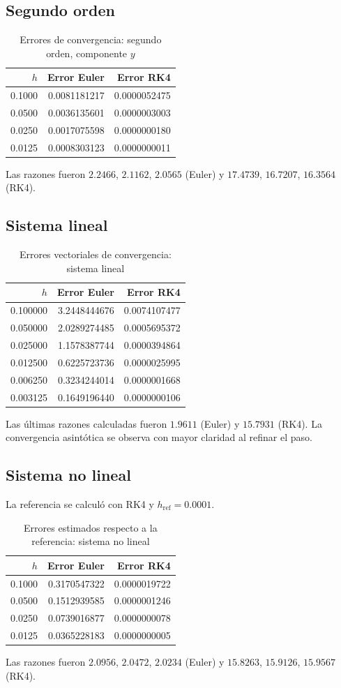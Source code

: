 \documentclass[12pt,letterpaper]{article}
\begin{document}
\subsection{Segundo orden}
\begin{table}[H]\centering\caption{Errores de convergencia: segundo orden, componente $y$}\small\begin{tabular}{rrr}\toprule $h$ & Error Euler & Error RK4\\\midrule
0.1000&0.0081181217&0.0000052475\\
0.0500&0.0036135601&0.0000003003\\
0.0250&0.0017075598&0.0000000180\\
0.0125&0.0008303123&0.0000000011\\\bottomrule\end{tabular}\end{table}
Las razones fueron $2.2466$, $2.1162$, $2.0565$ (Euler) y $17.4739$, $16.7207$, $16.3564$ (RK4).
\subsection{Sistema lineal}
\begin{table}[H]\centering\caption{Errores vectoriales de convergencia: sistema lineal}\small\begin{tabular}{rrr}\toprule $h$ & Error Euler & Error RK4\\\midrule
0.100000&3.2448444676&0.0074107477\\
0.050000&2.0289274485&0.0005695372\\
0.025000&1.1578387744&0.0000394864\\
0.012500&0.6225723736&0.0000025995\\
0.006250&0.3234244014&0.0000001668\\
0.003125&0.1649196440&0.0000000106\\\bottomrule\end{tabular}\end{table}
Las últimas razones calculadas fueron $1.9611$ (Euler) y $15.7931$ (RK4). La convergencia asintótica se observa con mayor claridad al refinar el paso.
\subsection{Sistema no lineal}
La referencia se calculó con RK4 y $h_{\mathrm{ref}}=0.0001$.
\begin{table}[H]\centering\caption{Errores estimados respecto a la referencia: sistema no lineal}\small\begin{tabular}{rrr}\toprule $h$ & Error Euler & Error RK4\\\midrule
0.1000&0.3170547322&0.0000019722\\
0.0500&0.1512939585&0.0000001246\\
0.0250&0.0739016877&0.0000000078\\
0.0125&0.0365228183&0.0000000005\\\bottomrule\end{tabular}\end{table}
Las razones fueron $2.0956$, $2.0472$, $2.0234$ (Euler) y $15.8263$, $15.9126$, $15.9567$ (RK4).
\end{document}
